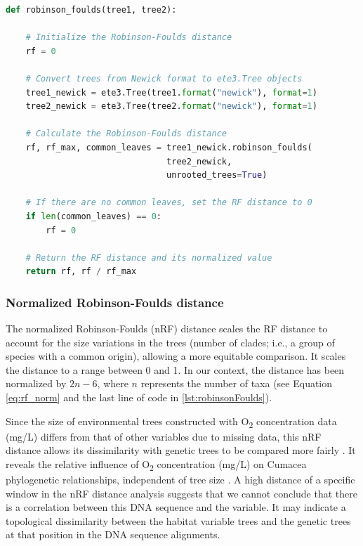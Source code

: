\begin{lstlisting}[label=lst:robinsonFoulds,language=Python,caption=Python script for calculating the Robinson-Foulds Distance using the ete3 package in the aPhyloGeo package. The Newick format represents the phylogenetic and variable trees in text form.]
def robinson_foulds(tree1, tree2):

    # Initialize the Robinson-Foulds distance
    rf = 0

    # Convert trees from Newick format to ete3.Tree objects
    tree1_newick = ete3.Tree(tree1.format("newick"), format=1)
    tree2_newick = ete3.Tree(tree2.format("newick"), format=1)

    # Calculate the Robinson-Foulds distance
    rf, rf_max, common_leaves = tree1_newick.robinson_foulds(
                                tree2_newick,
                                unrooted_trees=True)

    # If there are no common leaves, set the RF distance to 0
    if len(common_leaves) == 0:
        rf = 0

    # Return the RF distance and its normalized value
    return rf, rf / rf_max
\end{lstlisting}

\subsubsection{Normalized Robinson-Foulds distance}\label{RFnorm}
The normalized Robinson-Foulds (nRF) distance scales the RF distance to account for the size variations in the trees (number of clades; i.e., a group of species with a common origin), allowing a more equitable comparison. It scales the distance to a range between 0 and 1. In our context, the distance has been normalized by $2n-6$, where $n$ represents the number of taxa (see Equation \eqref{eq:rf_norm} and the last line of code in \autoref{lst:robinsonFoulds}).

Since the size of environmental trees constructed with O\textsubscript{2} concentration data (mg/L) differs from that of other variables due to missing data, this nRF distance allows its dissimilarity with genetic trees to be compared more fairly \citep{tahiri2018new, koshkarov_phylogeography_2022}. It reveals the relative influence of O\textsubscript{2} concentration (mg/L) on Cumacea phylogenetic relationships, independent of tree size \citep{tahiri2018new, koshkarov_phylogeography_2022}. A high distance of a specific window in the nRF distance analysis suggests that we cannot conclude that there is a correlation between this DNA sequence and the variable. It may indicate a topological dissimilarity between the habitat variable trees and the genetic trees at that position in the DNA sequence alignments.

